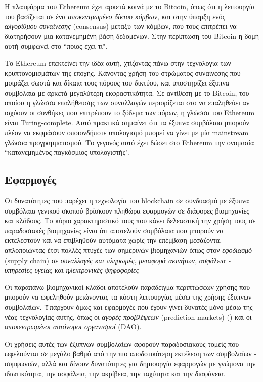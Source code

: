 Η πλατφόρμα του Ethereum έχει αρκετά κοινά με το Bitcoin, όπως ότι η λειτουργία του βασίζεται σε ένα
\textit{αποκεντρωμένο δίκτυο κόμβων}, και στην ύπαρξη ενός \textit{αλγορίθμου συναίνεσης} (consensus) μεταξύ των κόμβων,
που τους επιτρέπει να διατηρήσουν μια κατανεμημένη βάση δεδομένων. Στην περίπτωση του Bitcoin η δομή
αυτή συμφωνεί στο ``ποιος έχει τι". 

Το Ethereum επεκτείνει την ιδέα αυτή, χτίζοντας πάνω στην τεχνολογία των κρυπτονομισμάτων της εποχής.
Κάνοντας χρήση του στρώματος συναίνεσης που μοιράζει σωστά και δίκαια τους πόρους του δικτύου, και 
υποστηρίζει
έξυπνα συμβόλαια με αρκετά μεγαλύτερη εκφραστικότητα. Σε αντίθεση με το Bitcoin, του οποίου η γλώσσα επαλήθευσης των συναλλαγών περιορίζεται στο να επαληθεύει αν ισχύουν οι συνθήκες που επιτρέπουν το ξόδεμα των πόρων, η γλώσσα του Ethereum είναι Turing-complete. Αυτό πρακτικά σημαίνει ότι τα έξυπνα 
συμβόλαια μπορούν πλέον να εκφράσουν οποιονδήποτε υπολογισμό μπορεί να γίνει με μία mainstream 
γλώσσα προγραμματισμού. Το γεγονός αυτό έχει δώσει στο Ethereum την ονομασία ``κατανεμημένος 
παγκόσμιος υπολογιστής".


\subsection{Εφαρμογές}

Οι δυνατότητες που παρέχει η τεχνολογία του blockchain σε συνδυασμό με έξυπνα συμβόλαια γενικού
σκοπού βρίσκουν πληθώρα εφαρμογών σε διάφορες βιομηχανίες και κλάδους. Το κύριο χαρακτηριστικό
τους που κάνει δελεαστική την χρήση τους σε παραδοσιακές βιομηχανίες είναι ότι αποτελούν συμβόλαια
που μπορούν να εκτελεστούν και να επιβληθούν αυτόματα χωρίς την επέμβαση μεσάζοντα, απλοποιώντας
έτσι πολλές πτυχές των σημερινών βιομηχανιών όπως στον \textit{εφοδιασμό} (supply chain) σε \textit{συναλλαγές και πληρωμές},
  \textit{μεταφορά ακινήτων},
\textit{ασφάλεια - υπηρεσίες υγείας}
και \textit{ηλεκτρονικές ψηφοφορίες}


Οι παραπάνω βιομηχανικοί κλάδοι αποτελούν παράδειγμα περιπτώσεων χρήσης που μπορούν να ωφεληθούν
μειώνοντας τα κόστη λειτουργίας μέσω της χρήσης έξυπνων συμβολαίων. Υπάρχουν όμως και εφαρμογές
που έχουν γίνει δυνατές μόνο μέσω της νέας τεχνολογίας αυτής, όπως οι \emph{αγορές προβλέψεων} 
(prediction markets) (\cite{augur}) και οι \emph{αποκεντρωμένοι αυτόνομοι οργανισμοί} (DAO). 

Οι χρήσεις αυτές των έξυπνων συμβολαίων αφορούν παραδοσιακούς τομείς που ωφελούνται σε μεγάλο
βαθμό από την πιο αποδοτικότερη εκτέλεση των συμβολαίων - συμφωνιών, αλλά και δίνουν δυνατότητες
για δημιουργία εφαρμογών με γνώμονα την ιδιωτικότητα, την ασφάλεια, την ακρίβεια, την ταχύτητα και την 
διαφάνεια. 

